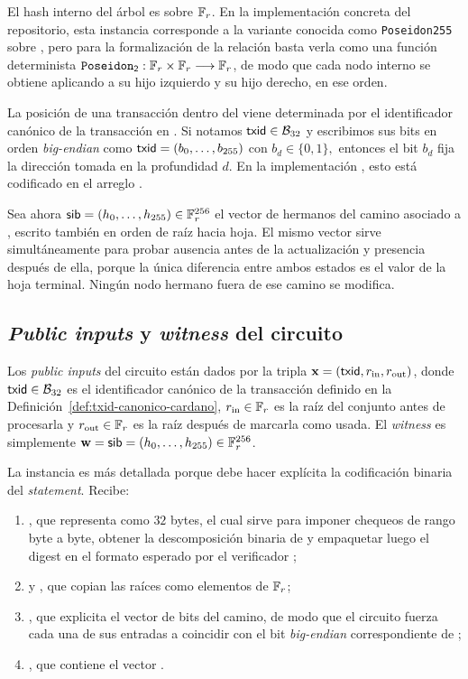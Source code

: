El hash interno del árbol es \PoseidonHash sobre $\mathbb{F}_r$. En la implementación concreta del repositorio, esta instancia corresponde a la variante conocida como \texttt{Poseidon255} sobre \BLS, pero para la formalización de la relación basta verla como una función determinista $\texttt{Poseidon}_{\mathsf{2}}: \mathbb{F}_r \times \mathbb{F}_r \longrightarrow \mathbb{F}_r$, de modo que cada nodo interno se obtiene aplicando \PoseidonTwo a su hijo izquierdo y su hijo derecho, en ese orden.

La posición de una transacción dentro del \SMT viene determinada por el identificador canónico de la transacción en \Cardano. Si notamos $\mathsf{txid} \in \mathcal{B}_{32}$ y escribimos sus bits en orden \textit{big-endian} como $\mathsf{txid} = (b_0,\ldots,b_{255})$ con $b_d \in \{0,1\},$ entonces el bit $b_d$ fija la dirección tomada en la profundidad $d$. En la implementación \Circom, esto está codificado en el arreglo \MtPathIndexesArray.

Sea ahora $\mathsf{sib} = (h_0,\ldots,h_{255}) \in \mathbb{F}_r^{256}$ el vector de hermanos del camino asociado a \TxId, escrito también en orden de raíz hacia hoja. El mismo vector \SiblingVec sirve simultáneamente para probar ausencia antes de la actualización y presencia después de ella, porque la única diferencia entre ambos estados es el valor de la hoja terminal. Ningún nodo hermano fuera de ese camino se modifica.

\subsection{\textit{Public inputs} y \textit{witness} del circuito}
\label{subsec:tx-set-update-public-inputs-y-witness-del-circuito}

Los \textit{public inputs} del circuito están dados por la tripla $\mathbf{x} = (\mathsf{txid}, r_{\mathrm{in}}, r_{\mathrm{out}})$, donde $\mathsf{txid} \in \mathcal{B}_{32}$ es el identificador canónico de la transacción definido en la Definición~\ref{def:txid-canonico-cardano}, $r_{\mathrm{in}} \in \mathbb{F}_r$ es la raíz del conjunto antes de procesarla y $r_{\mathrm{out}} \in \mathbb{F}_r$ es la raíz después de marcarla como usada. El \textit{witness} es simplemente $\mathbf{w} = \mathsf{sib} = (h_0,\ldots,h_{255}) \in \mathbb{F}_r^{256}$.

La instancia \Circom es más detallada porque debe hacer explícita la codificación binaria del \textit{statement}. Recibe:
\begin{enumerate}[noitemsep]
  \item {}, que representa \TxId como $32$ bytes, el cual sirve para imponer chequeos de rango byte a byte, obtener la descomposición binaria de \TxId y empaquetar luego el digest en el formato esperado por el verificador \Groth;
  \item \MtRootIn y \MtRootOut, que copian las raíces como elementos de $\mathbb{F}_r$;
  \item {}, que explicita el vector de bits del camino, de modo que el circuito fuerza cada una de sus entradas a coincidir con el bit \textit{big-endian} correspondiente de \TxIdBytesArray;
  \item {}, que contiene el vector \SiblingVec.
\end{enumerate}

